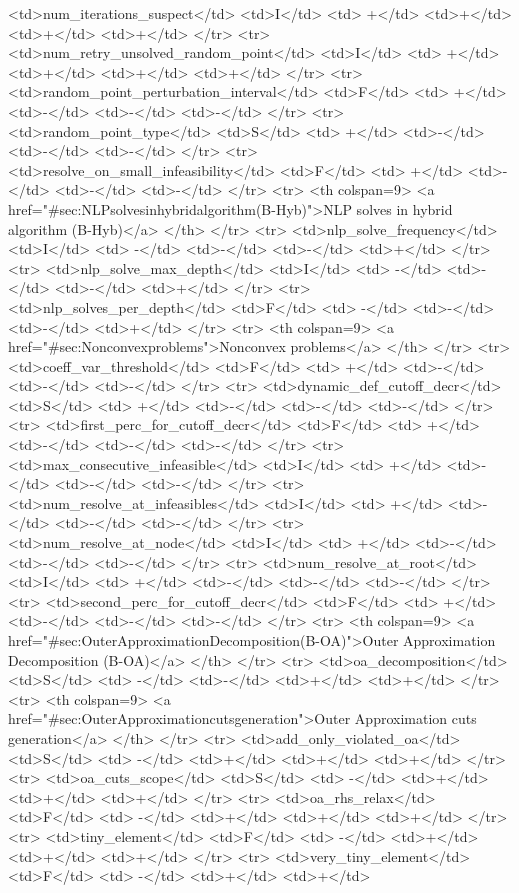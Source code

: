 {{<td>num_iterations_suspect</td>
<td>I</td>
<td> +</td>
<td>+</td>
<td>+</td>
<td>+</td>
</tr>
<tr>
<td>num_retry_unsolved_random_point</td>
<td>I</td>
<td> +</td>
<td>+</td>
<td>+</td>
<td>+</td>
</tr>
<tr>
<td>random_point_perturbation_interval</td>
<td>F</td>
<td> +</td>
<td>-</td>
<td>-</td>
<td>-</td>
</tr>
<tr>
<td>random_point_type</td>
<td>S</td>
<td> +</td>
<td>-</td>
<td>-</td>
<td>-</td>
</tr>
<tr>
<td>resolve_on_small_infeasibility</td>
<td>F</td>
<td> +</td>
<td>-</td>
<td>-</td>
<td>-</td>
</tr>
<tr>   <th colspan=9> <a href="#sec:NLPsolvesinhybridalgorithm(B-Hyb)">NLP solves in hybrid algorithm (B-Hyb)</a> </th>
</tr>
<tr>
<td>nlp_solve_frequency</td>
<td>I</td>
<td> -</td>
<td>-</td>
<td>-</td>
<td>+</td>
</tr>
<tr>
<td>nlp_solve_max_depth</td>
<td>I</td>
<td> -</td>
<td>-</td>
<td>-</td>
<td>+</td>
</tr>
<tr>
<td>nlp_solves_per_depth</td>
<td>F</td>
<td> -</td>
<td>-</td>
<td>-</td>
<td>+</td>
</tr>
<tr>   <th colspan=9> <a href="#sec:Nonconvexproblems">Nonconvex problems</a> </th>
</tr>
<tr>
<td>coeff_var_threshold</td>
<td>F</td>
<td> +</td>
<td>-</td>
<td>-</td>
<td>-</td>
</tr>
<tr>
<td>dynamic_def_cutoff_decr</td>
<td>S</td>
<td> +</td>
<td>-</td>
<td>-</td>
<td>-</td>
</tr>
<tr>
<td>first_perc_for_cutoff_decr</td>
<td>F</td>
<td> +</td>
<td>-</td>
<td>-</td>
<td>-</td>
</tr>
<tr>
<td>max_consecutive_infeasible</td>
<td>I</td>
<td> +</td>
<td>-</td>
<td>-</td>
<td>-</td>
</tr>
<tr>
<td>num_resolve_at_infeasibles</td>
<td>I</td>
<td> +</td>
<td>-</td>
<td>-</td>
<td>-</td>
</tr>
<tr>
<td>num_resolve_at_node</td>
<td>I</td>
<td> +</td>
<td>-</td>
<td>-</td>
<td>-</td>
</tr>
<tr>
<td>num_resolve_at_root</td>
<td>I</td>
<td> +</td>
<td>-</td>
<td>-</td>
<td>-</td>
</tr>
<tr>
<td>second_perc_for_cutoff_decr</td>
<td>F</td>
<td> +</td>
<td>-</td>
<td>-</td>
<td>-</td>
</tr>
<tr>   <th colspan=9> <a href="#sec:OuterApproximationDecomposition(B-OA)">Outer Approximation Decomposition (B-OA)</a> </th>
</tr>
<tr>
<td>oa_decomposition</td>
<td>S</td>
<td> -</td>
<td>-</td>
<td>+</td>
<td>+</td>
</tr>
<tr>   <th colspan=9> <a href="#sec:OuterApproximationcutsgeneration">Outer Approximation cuts generation</a> </th>
</tr>
<tr>
<td>add_only_violated_oa</td>
<td>S</td>
<td> -</td>
<td>+</td>
<td>+</td>
<td>+</td>
</tr>
<tr>
<td>oa_cuts_scope</td>
<td>S</td>
<td> -</td>
<td>+</td>
<td>+</td>
<td>+</td>
</tr>
<tr>
<td>oa_rhs_relax</td>
<td>F</td>
<td> -</td>
<td>+</td>
<td>+</td>
<td>+</td>
</tr>
<tr>
<td>tiny_element</td>
<td>F</td>
<td> -</td>
<td>+</td>
<td>+</td>
<td>+</td>
</tr>
<tr>
<td>very_tiny_element</td>
<td>F</td>
<td> -</td>
<td>+</td>
<td>+</td>
}}

